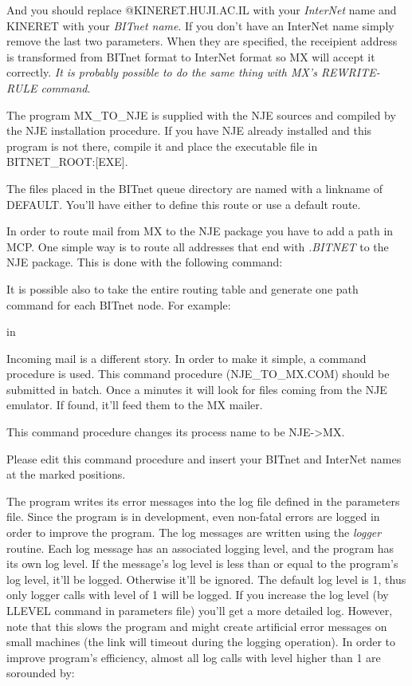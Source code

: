 And you should replace @KINERET.HUJI.AC.IL with your {\sl InterNet} name
and KINERET with your {\sl BITnet name}. If you don't have an InterNet
name simply remove the last two parameters. When they are specified, the
receipient address is transformed from BITnet format to InterNet format so
MX will accept it correctly. {\sl It is probably possible to do the same
thing with MX's REWRITE-RULE command}.

The program {\ncrBold MX\_TO\_NJE} is supplied with the NJE sources and compiled
by the NJE installation procedure. If you have NJE already installed and this
program is not there, compile it and place the executable file in
BITNET\_ROOT:[EXE].

The files placed in the BITnet queue directory are named with a linkname of
{\ncrBold DEFAULT}. You'll have either to define this route or use a default
route.

In order to route mail from MX to the NJE package you have to add a path in
MCP. One simple way is to route all addresses that end with {\sl .BITNET} to
the NJE package. This is done with the following command:


It is possible also to take the entire routing table and generate one path
command for each BITnet node. For example:


 in

Incoming mail is a different story. In order to make it simple, a command
procedure is used. This command procedure ({\ncrBold NJE\_TO\_MX.COM}) should
be submitted in batch. Once a minutes it will look for files coming from the
NJE emulator. If found, it'll feed them to the MX mailer.

This command procedure changes its process name to be NJE->MX.

Please edit this command procedure and insert your BITnet and InterNet names
at the marked positions.

\vfill\eject


The program writes its error messages into the log  file  defined  in
the parameters file. Since the program is in development, even non-fatal
errors are logged in order to improve the program. The log messages  are
written  using  the  {\sl logger}  routine. Each log message has an associated
logging level, and the program has its own log level. If  the  message's
log  level  is  less  than or equal to the program's log level, it'll be
logged. Otherwise it'll be ignored. The default log  level  is  1,  thus
only  logger  calls  with level of 1 will be logged. If you increase the
log level (by
{\ncrBold LLEVEL} command in  parameters  file)  you'll  get  a  more
detailed log. However, note that this slows the program and might create
artificial error messages on  small  machines  (the  link  will  timeout
during the logging operation). In order to improve program's efficiency,
almost all log calls with level higher than 1 are sorounded by:

